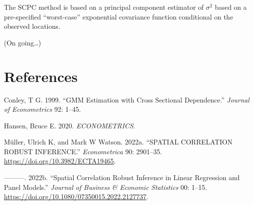 \documentclass[
]{article}
\newlength{\cslhangindent}
\newlength{\cslentryspacingunit} %
\newenvironment{CSLReferences}[2] %
 {%
  \setlength{\parindent}{0pt}
  \ifodd #1
  \let\oldpar\par
  \def\par{\hangindent=\cslhangindent\oldpar}
  \fi
  \setlength{\parskip}{#2\cslentryspacingunit}
 }%
 {}
\begin{document}
The SCPC method is based on a principal component estimator of
\(\sigma^2\) based on a pre-specified ``worst-case'' exponential
covariance function conditional on the observed locations.

(On going\ldots)

\hypertarget{references}{%
\section*{References}\label{references}}

\hypertarget{refs}{}
\begin{CSLReferences}{1}{0}
\leavevmode{}%
Conley, T G. 1999. {``GMM Estimation with Cross Sectional Dependence.''}
\emph{Journal of Econometrics} 92: 1--45.

\leavevmode{}%
Hansen, Bruce E. 2020. \emph{ECONOMETRICS}.

\leavevmode{}%
Müller, Ulrich K, and Mark W Watson. 2022a. {``SPATIAL CORRELATION
ROBUST INFERENCE.''} \emph{Econometrica} 90: 2901--35.
\url{https://doi.org/10.3982/ECTA19465}.

\leavevmode{}%
---------. 2022b. {``Spatial Correlation Robust Inference in Linear
Regression and Panel Models.''} \emph{Journal of Business \& Economic
Statistics} 00: 1--15.
\url{https://doi.org/10.1080/07350015.2022.2127737}.

\end{CSLReferences}
\end{document}
